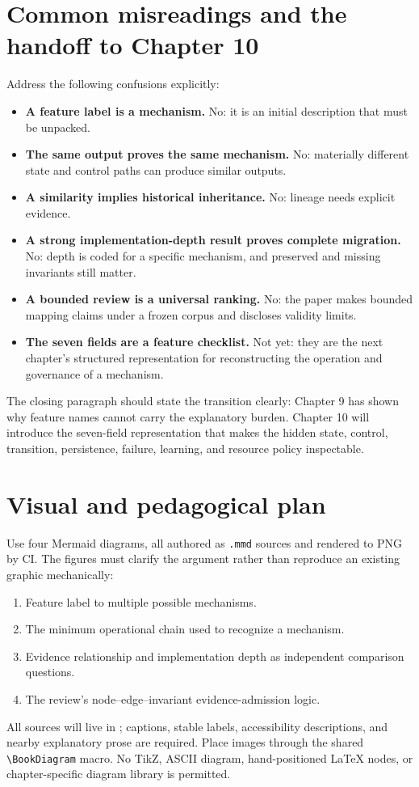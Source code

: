 \section{Common misreadings and the handoff to Chapter 10}
Address the following confusions explicitly:
\begin{itemize}
  \item \textbf{A feature label is a mechanism.} No: it is an initial description that must be unpacked.
  \item \textbf{The same output proves the same mechanism.} No: materially different state and control paths can produce similar outputs.
  \item \textbf{A similarity implies historical inheritance.} No: lineage needs explicit evidence.
  \item \textbf{A strong implementation-depth result proves complete migration.} No: depth is coded for a specific mechanism, and preserved and missing invariants still matter.
  \item \textbf{A bounded review is a universal ranking.} No: the paper makes bounded mapping claims under a frozen corpus and discloses validity limits.
  \item \textbf{The seven fields are a feature checklist.} Not yet: they are the next chapter's structured representation for reconstructing the operation and governance of a mechanism.
\end{itemize}
The closing paragraph should state the transition clearly: Chapter 9 has shown why feature names cannot carry the explanatory burden. Chapter 10 will introduce the seven-field representation that makes the hidden state, control, transition, persistence, failure, learning, and resource policy inspectable.

\section{Visual and pedagogical plan}
Use four Mermaid diagrams, all authored as \texttt{.mmd} sources and rendered to PNG by CI. The figures must clarify the argument rather than reproduce an existing graphic mechanically:
\begin{enumerate}
  \item Feature label to multiple possible mechanisms.
  \item The minimum operational chain used to recognize a mechanism.
  \item Evidence relationship and implementation depth as independent comparison questions.
  \item The review's node--edge--invariant evidence-admission logic.
\end{enumerate}
All sources will live in ; captions, stable labels, accessibility descriptions, and nearby explanatory prose are required. Place images through the shared \texttt{\textbackslash BookDiagram} macro. No TikZ, ASCII diagram, hand-positioned LaTeX nodes, or chapter-specific diagram library is permitted.

